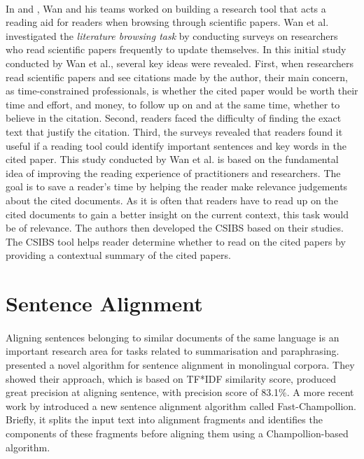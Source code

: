 \paragraph{}
In \cite{citation-sensitive} and \cite{csibs}, Wan and his teams worked on building a research tool that acts a reading aid for readers when browsing through scientific papers. Wan et al. investigated the \textit{literature browsing task} by conducting surveys on researchers who read scientific papers frequently to update themselves. In this initial study conducted by Wan et al., several key ideas were revealed. First, when researchers read scientific papers and see citations made by the author, their main concern, as time-constrained professionals, is whether the cited paper would be worth their time and effort, and money, to follow up on and at the same time, whether to believe in the citation. Second, readers faced the difficulty of finding the exact text that justify the citation. Third, the surveys revealed that readers found it useful if a reading tool could identify important sentences and key words in the cited paper. This study conducted by Wan et al. is based on the fundamental idea of improving the reading experience of practitioners and researchers. The goal is to save a reader's time by helping the reader make relevance judgements about the cited documents. As it is often that readers have to read up on the cited documents to gain a better insight on the current context, this task would be of relevance. The authors then developed the CSIBS based on their studies. The CSIBS tool helps reader determine whether to read on the cited papers by providing a contextual summary of the cited papers.

\section{Sentence Alignment}
\paragraph{}
Aligning sentences belonging to similar documents of the same language is an important research area for tasks related to summarisation and paraphrasing. \cite{nelken2006towards} presented a novel algorithm for sentence alignment in monolingual corpora. They showed their approach, which is based on TF*IDF similarity score, produced great precision at aligning sentence, with precision score of 83.1\%. A more recent work by \cite{li2010fast} introduced a new sentence alignment algorithm called Fast-Champollion. Briefly, it splits the input text into alignment fragments and identifies the components of these fragments before aligning them using a Champollion-based algorithm.

